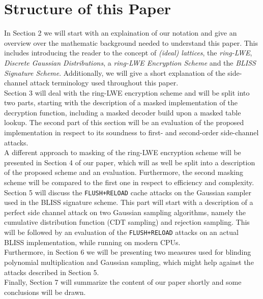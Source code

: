 \section{Structure of this Paper}
In Section 2 we will start with an explaination of our notation and give an overview over the mathematic background needed to understand this paper. This includes introducing the reader to the concept of \textit{(ideal) lattices}, the \textit{\ac{ring-LWE}}, \textit{Discrete Gaussian Distributions}, a \textit{\ac{ring-LWE} Encryption Scheme} and the \textit{BLISS Signature Scheme}. Additionally, we will give a short explanation of the side-channel attack terminology used throughout this paper.\\ 
Section 3 will deal with the ring-LWE encryption scheme and will be split into two parts, starting with the description of a masked implementation of the decryption function, including a masked decoder build upon a masked table lookup. The second part of this section will be an evaluation of the proposed implementation in respect to its soundness to first- and second-order side-channel attacks.\\ 
A different approach to masking of the \ac{ring-LWE} encryption scheme will be presented in Section 4 of our paper, which will as well be split into a description of the proposed scheme and an evaluation. Furthermore, the second masking scheme will be compared to the first one in respect to efficiency and complexity.\\
Section 5 will discuss the \verb|FLUSH+RELOAD| cache attacks on the Gaussian sampler used in the BLISS signature scheme. This part will start with a description of a perfect side channel attack on two Gaussian sampling algorithms, namely the cumulative distribution function (CDT sampling) and rejection sampling. This will be followed by an evaluation of the \verb|FLUSH+RELOAD| attacks on an actual BLISS implementation, while running on modern CPUs.\\
Furthermore, in Section 6 we will be presenting two measures used for blinding polynomial multiplication and Gaussian sampling, which might help against the attacks described in Section 5.\\
Finally, Section 7 will summarize the content of our paper shortly and some conclusions will be drawn.